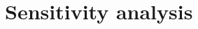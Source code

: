 \documentclass[a4paper, 5p, sort&compress]{elsarticle}%
\begin{document}

\section{Sensitivity analysis}
\label{sec:sensitivity-analysis}
\end{document}
